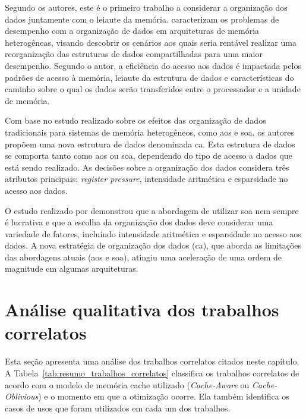 Segundo os autores, este é o primeiro trabalho a considerar a organização dos dados juntamente com o leiaute da memória.
 caracterizam os problemas de desempenho com a organização de dados em arquiteturas de memória heterogêneas, visando descobrir os cenários aos quais seria rentável realizar uma reorganização das estruturas de dados compartilhadas para uma maior desempenho.
Segundo o autor, a eficiência do acesso aos dados é impactada pelos padrões de acesso à memória, leiaute da estrutura de dados e características do caminho sobre o qual os dados serão transferidos entre o processador e a unidade de memória.

Com base no estudo realizado sobre os efeitos das organização de dados tradicionais para sistemas de memória heterogêneos, como \ac{aos} e \ac{soa}, os autores propõem uma nova estrutura de dados denominada \ac{ca}.
Esta estrutura de dados se comporta tanto como \ac{aos} ou \ac{soa}, dependendo do tipo de acesso a dados que está sendo realizado.
As decisões sobre a organização dos dados considera três atributos principais: \textit{register pressure}, intensidade aritmética e esparsidade no acesso aos dados.

O estudo realizado por  demonstrou que a abordagem de utilizar \ac{soa} nem sempre é lucrativa e que a escolha da organização dos dados deve considerar uma variedade de fatores, incluindo intensidade aritmética e esparsidade no acesso aos dados.
A nova estratégia de organização dos dados (\ac{ca}), que aborda as limitações das abordagens atuais (\ac{aos} e \ac{soa}), atingiu uma aceleração de uma ordem de magnitude em algumas arquiteturas.

\section{Análise qualitativa dos trabalhos correlatos}
\label{sec:analise_trabalhos_correlatos}

Esta seção apresenta uma análise dos trabalhos correlatos citados neste capítulo.
A Tabela~\ref{tab:resumo_trabalhos_correlatos} classifica os trabalhos correlatos de acordo com o modelo de memória cache utilizado (\textit{Cache-Aware} ou \textit{Cache-Oblivious}) e o momento em que a otimização ocorre.
Ela também identifica os casos de usos que foram utilizados em cada um dos trabalhos.


